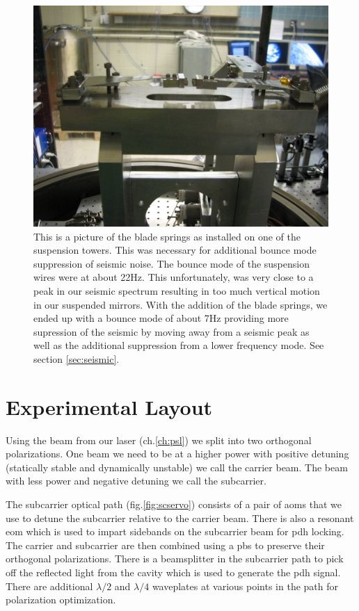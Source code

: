 
\begin{figure}
\centering
  \includegraphics[width=15cm]{./figures/bladesprings.jpg}
  \caption[Blade Spring Modification for Vertical Isolation]{
  This is a picture of the blade springs as installed on one of the suspension
  towers.
  This was necessary for additional bounce mode suppression of seismic noise.
  The bounce mode of the suspension wires were at about 22Hz.
  This unfortunately, was very close to a peak in our seismic spectrum
  resulting in too much vertical motion in our suspended mirrors.
  With the addition of the blade springs, we ended up with a bounce mode of
  about 7Hz providing more supression of the seismic by moving away from a
  seismic peak as well as the additional suppression from a lower frequency
  mode. See section \ref{sec:seismic}.
  }
  \label{fig:blades}
\end{figure}

\section{Experimental Layout}
Using the beam from our laser (ch.\ref{ch:psl}) we split into two orthogonal
polarizations. One beam we need to be at a higher power with positive detuning
(statically stable and dynamically unstable) we call the carrier beam. The
beam with less power and negative detuning we call the subcarrier.

The subcarrier optical path (fig.\ref{fig:scservo}) consists of a pair of \ac{aom}s that we use to
detune the subcarrier relative to the carrier beam.
There is also a resonant
\ac{eom} which is used to impart sidebands on the subcarrier beam for \ac{pdh}
locking.
The carrier and subcarrier are then combined using a \ac{pbs} to preserve their
orthogonal polarizations. There is a beamsplitter in the subcarrier path to pick
off the reflected light from the cavity which is used to generate the \ac{pdh}
signal. There are additional $\lambda/2$ and $\lambda/4$ waveplates at various
points in the path for polarization optimization.

